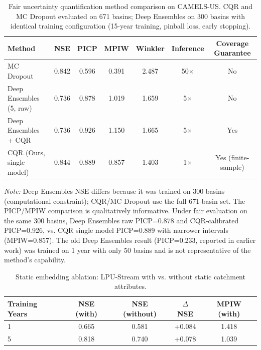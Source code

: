 \begin{table}[h]
\caption{Fair uncertainty quantification method comparison on CAMELS-US. CQR and MC Dropout evaluated on 671 basins; Deep Ensembles on 300 basins with identical training configuration (15-year training, pinball loss, early stopping).}
\label{tab:uq_comparison}
\begin{tabular}{lcccccc}
\hline
Method & NSE & PICP & MPIW & Winkler & Inference & Coverage Guarantee \\
\hline
MC Dropout & 0.842 & 0.596 & 0.391 & 2.487 & 50$\times$ & No \\
Deep Ensembles (5, raw) & 0.736 & 0.878 & 1.019 & 1.659 & 5$\times$ & No \\
Deep Ensembles + CQR & 0.736 & 0.926 & 1.150 & 1.665 & 5$\times$ & Yes \\
CQR (Ours, single model) & 0.844 & 0.889 & 0.857 & 1.403 & 1$\times$ & Yes (finite-sample) \\
\hline
\end{tabular}
\vspace{2mm}
\footnotesize{\textit{Note:} Deep Ensembles NSE differs because it was trained on 300 basins (computational constraint); CQR/MC Dropout use the full 671-basin set. The PICP/MPIW comparison is qualitatively informative. Under fair evaluation on the same 300 basins, Deep Ensembles raw PICP=0.878 and CQR-calibrated PICP=0.926, vs. CQR single model PICP=0.889 with narrower intervals (MPIW=0.857). The old Deep Ensembles result (PICP=0.233, reported in earlier work) was trained on 1 year with only 50 basins and is not representative of the method's capability.}
\end{table}


\begin{table}[h]
\caption{Static embedding ablation: LPU-Stream with vs. without static catchment attributes.}
\label{tab:ablation}
\begin{tabular}{lcccc}
\hline
Training Years & NSE (with) & NSE (without) & $\Delta$ NSE & MPIW (with) \\
\hline
1 & 0.665 & 0.581 & +0.084 & 1.418 \\
5 & 0.818 & 0.740 & +0.078 & 1.039 \\
\hline
\end{tabular}
\end{table}


